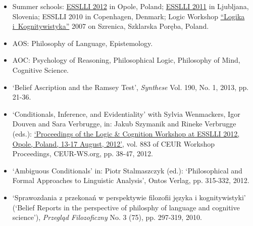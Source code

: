\documentclass[a4paper,12pt]{article}
\begin{document}
\begin{small}
\begin{itemize}
  \item Summer schools: %
    \href{http://www.esslli2012.pl}{ESSLLI 2012} in Opole, Poland;
    \href{http://esslli2011.ijs.si}{ESSLLI 2011} in Ljubljana, Slovenia;
    ESSLLI 2010 in Copenhagen, Denmark;
    Logic Workshop \href{http://www.logika.uw.edu.pl/warsztaty2007/index.html}{``Logika i~Kognitywistyka''} 2007 on
    Szrenica, Szklarska Poręba, Poland.
  \end{itemize}
  
  \begin{itemize}
  \item AOS: Philosophy of Language, Epistemology.
  \item AOC: Psychology of Reasoning, Philosophical Logic, Philosophy
    of Mind, Cognitive Science.
  \end{itemize}

  
  
  
  \begin{itemize}
  \item `Belief Ascription and the Ramsey Test', \emph{Synthese}
    Vol. 190, No. 1, 2013, pp. 21-36. %

  \item `Conditionals, Inference, and Evidentiality' with Sylvia
    Wenmackers, Igor Douven and Sara Verbrugge, in: Jakub Szymanik and
    Rineke Verbrugge (eds.):
    \href{http://ceur-ws.org/Vol-883/}{`Proceedings of the Logic \&
      Cognition Workshop at ESSLLI 2012, Opole, Poland, 13-17 August,
      2012'}, vol. 883 of CEUR Workshop Proceedings, CEUR-WS.org,
    pp. 38-47, 2012.

  \item `Ambiguous Conditionals' in: Piotr Stalmaszczyk (ed.):
    `Philosophical and Formal Approaches to Linguistic Analysis',
    Ontos Verlag, pp. 315-332, 2012.

  \item `Sprawozdania z przekonań w perspektywie filozofii języka i
    kognitywistyki' (`Belief Reports in the perspective of philosphy
    of language and cognitive science'), \emph{Przegląd Filozoficzny}
    No. 3 (75), pp. 297-319, 2010.


\end{itemize}
\end{small}
\end{document}
